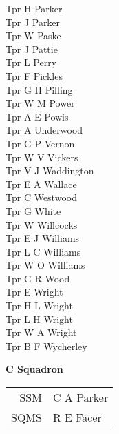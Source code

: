 \begin{multicols}{3}
  Tpr H Parker \\
  Tpr J Parker \\
  Tpr W Paske \\
  Tpr J Pattie \\
  Tpr L Perry \\
  Tpr F Pickles \\
  Tpr G H Pilling \\
  Tpr W M Power \\
  Tpr A E Powis \\
  Tpr A Underwood \\
  Tpr G P Vernon \\
  Tpr W V Vickers \\
  Tpr V J Waddington \\
  Tpr E A Wallace \\
  Tpr C Westwood \\
  Tpr G White \\
  Tpr W Willcocks \\
  Tpr E J Williams \\
  Tpr L C Williams \\
  Tpr W O Williams \\
  Tpr G R Wood \\
  Tpr E Wright \\
  Tpr H L Wright \\
  Tpr L H Wright \\
  Tpr W A Wright \\
  Tpr B F Wycherley \\
\end{multicols}

\vspace*{10mm}

\begin{center}
  \Large
  \textbf{C Squadron}
\end{center}

\begin{center}
  \begin{tabular}{rl}
    SSM & C A Parker \\
    SQMS & R E Facer \\
  \end{tabular}
\end{center}

